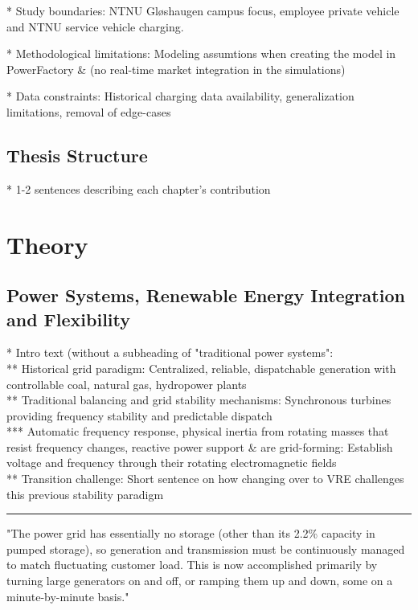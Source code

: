 * Study boundaries: NTNU Gløshaugen campus focus, employee private vehicle and NTNU service vehicle charging.

* Methodological limitations: Modeling assumtions when creating the model in PowerFactory \& (no real-time market integration in the simulations)

* Data constraints: Historical charging data availability, generalization limitations, removal of edge-cases

\subsection{Thesis Structure}

* 1-2 sentences describing each chapter's contribution


\section{Theory}

\subsection{Power Systems, Renewable Energy Integration and Flexibility}


* Intro text (without a subheading of "traditional power systems":\\
** Historical grid paradigm: Centralized, reliable, dispatchable generation with controllable coal, natural gas, hydropower plants \\ 
** Traditional balancing and grid stability mechanisms: Synchronous turbines providing frequency stability and predictable dispatch \\
*** Automatic frequency response, physical inertia from rotating masses that resist frequency changes, reactive power support \& are grid-forming: Establish voltage and frequency through their rotating electromagnetic fields \\
** Transition challenge: Short sentence on how changing over to VRE challenges this previous stability paradigm

\hrule

"The power grid has essentially no storage (other than its 2.2\% capacity in pumped storage), so generation and transmission must be continuously managed to match fluctuating customer load. This is now accomplished primarily by turning large generators on and off, or ramping them up and down, some on a minute-by-minute basis." \cite{kempton_vehicle--grid_2005}

